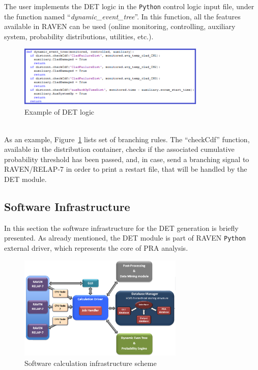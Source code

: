 The user implements the DET logic in the \verb!Python! control logic input file, under the function named ``\emph{dynamic\_event\_tree}''. In this function, all the features available in RAVEN can be used (online monitoring, controlling, auxiliary system, probability distributions, utilities, etc.). 
\begin{figure}[h] 
  \centering
     \includegraphics[width=0.8\textwidth]{figures/BranchingLaws.png}
  \caption{Example of DET logic}
   \label{fig:DET_branchLaws}
\end{figure}
\\As an example, Figure~\ref{fig:DET_branchLaws} lists set of branching rules. The ``checkCdf'' function, available in the distribution container, checks if the associated cumulative probability  threshold has been passed, and, in case, send a branching signal to RAVEN/RELAP-7 in order to print a restart file, that will be handled by the DET module. 
\subsection{Software Infrastructure} 
\label{sec:CPUInfrastructure}
In this section the software infrastructure for the DET generation is briefly presented. As already mentioned, the DET module is part of RAVEN \verb!Python! external driver, which represents the core of PRA analysis.
\begin{figure}[h] 
  \centering
     \includegraphics[width=0.70\textwidth]{figures/softwareCalcStructure.png}
  \caption{Software calculation infrastructure scheme}
   \label{fig:softwareInfrastructure}
\end{figure} 

